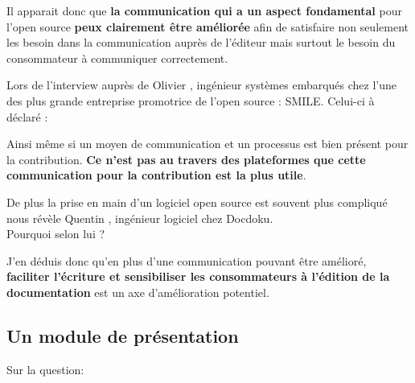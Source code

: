 			Il apparait donc que \textbf{la communication qui a un aspect fondamental} pour l'open source \textbf{peux clairement être améliorée} afin de satisfaire non seulement les besoin dans la communication auprès de l'éditeur mais surtout le besoin du consommateur à communiquer correctement.

			Lors de l'interview auprès de Olivier , ingénieur systèmes embarqués chez l'une des plus grande entreprise promotrice de l'open source : SMILE. Celui-ci à déclaré : 

			\begin{center}
				\textit{
				}
			\end{center}

			Ainsi même si un moyen de communication et un processus est bien présent pour la contribution. \textbf{Ce n'est pas au travers des plateformes que cette communication pour la contribution est la plus utile}.

			De plus la prise en main d'un logiciel open source est souvent plus compliqué nous révèle Quentin , ingénieur logiciel chez Docdoku.\\

			Pourquoi selon lui ?

			\begin{center}
				\textit{
				}
			\end{center}

			J'en déduis donc qu'en plus d'une communication pouvant être amélioré, \textbf{faciliter l'écriture et sensibiliser les consommateurs à l'édition de la documentation} est un axe d'amélioration potentiel.

		\newpage

		\subsection{Un module de présentation}

			Sur la question:

			\begin{center}
				\textit{
				}
			\end{center}

